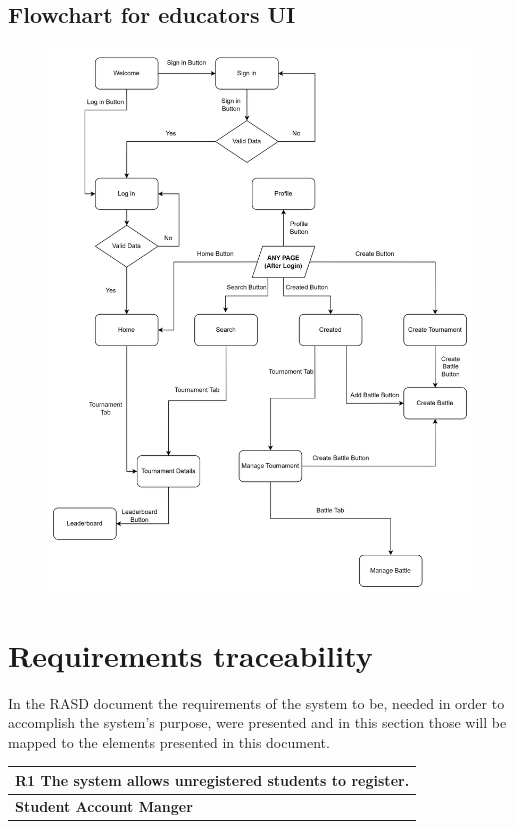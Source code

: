 \documentclass[12pt, a4paper]{report}
\begin{document}
    \section{Flowchart for educators UI}
    \begin{figure}[H]
        \centering
        \includegraphics[width=0.9\linewidth]{images/educators_UI.png}
    \end{figure}

\chapter{Requirements traceability}

In the RASD document the requirements of the system to be, needed in order to accomplish the system's purpose,
were presented and in this section those will be mapped to the elements presented in this document.

\begin{table}[H]
    \begin{tabularx}{\textwidth}{X}
    \textbf{R1} The system allows unregistered students to register.\\
    \hline 
    \textbf{Student Account Manger}
\end{tabularx}
\end{table}
\end{document}
